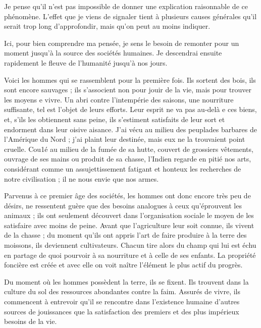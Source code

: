 \documentclass[french,twoside]{book} %
\begin{document}
Je pense qu’il n’est pas impossible de donner une explication raisonnable de ce phénomène. L'effet que je viens de signaler tient à plusieurs causes générales qu’il serait trop long d’approfondir, mais qu’on peut au moins indiquer.\par
Ici, pour bien comprendre ma pensée, je sens le besoin de remonter pour un moment jusqu’à la source des sociétés humaines. Je descendrai ensuite rapidement le fleuve de l’humanité jusqu’à nos jours.\par
Voici les hommes qui se rassemblent pour la première fois. Ils sortent des bois, ils sont encore sauvages ; ils s’associent non pour jouir de la vie, mais pour trouver les moyens e vivre. Un abri contre l’intempérie des saisons, une nourriture suffisante, tel est l’objet de leurs efforts. Leur esprit ne va pas au-delà e ces biens, et, s’ils les obtiennent sans peine, ils s’estiment satisfaits de leur sort et endorment dans leur oisive aisance. J'ai vécu au milieu des peuplades barbares de l’Amérique du Nord ; j’ai plaint leur destinée, mais eux ne la trouvaient point cruelle. Cou1é au milieu de la fumée de sa hutte, couvert de grossiers vêtements, ouvrage de ses mains ou produit de sa chasse, l’Indien regarde en pitié nos arts, considérant comme un assujettissement fatigant et honteux les recherches de notre civilisation ; il ne nous envie que nos armes.\par
Parvenus à ce premier âge des sociétés, les hommes ont donc encore très peu de désirs, ne ressentent guère que des besoins analogues à ceux qu’éprouvent les animaux ; ils ont seulement découvert dans l’organisation sociale le moyen de les satisfaire avec moins de peine. Avant que l’agriculture leur soit connue, ils vivent de la chasse ; du moment qu’ils ont appris l’art de faire produire à la terre des moissons, ils deviennent cultivateurs. Chacun tire alors du champ qui lui est échu en partage de quoi pourvoir à sa nourriture et à celle de ses enfants. La propriété foncière est créée et avec elle on voit naître l’élément le plus actif du progrès.\par
Du moment où les hommes possèdent la terre, ils se fixent. Ils trouvent dans la culture du sol des ressources abondantes contre la faim. Assurés de vivre, ils commencent à entrevoir qu’il se rencontre dans l’existence humaine d’autres sources de jouissances que la satisfaction des premiers et des plus impérieux besoins de la vie.\par
\end{document}
